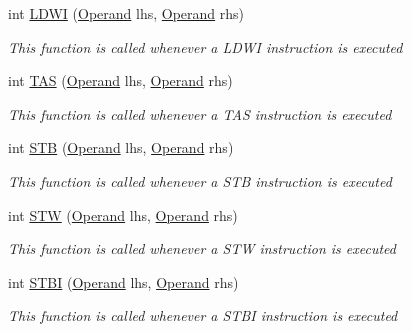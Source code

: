 \begin{DoxyCompactItemize}
int \hyperlink{class_c_p_u___o_s___simulator_1_1_c_p_u_1_1_instruction_a2a8c6cf1d6f14e9d219fabc5957cd586}{L\+D\+W\+I} (\hyperlink{class_c_p_u___o_s___simulator_1_1_c_p_u_1_1_operand}{Operand} lhs, \hyperlink{class_c_p_u___o_s___simulator_1_1_c_p_u_1_1_operand}{Operand} rhs)
\begin{DoxyCompactList}\small\item\em This function is called whenever a L\+D\+W\+I instruction is executed \end{DoxyCompactList}\item 
int \hyperlink{class_c_p_u___o_s___simulator_1_1_c_p_u_1_1_instruction_a78fbef41ec65046f35456e7cb161d037}{T\+A\+S} (\hyperlink{class_c_p_u___o_s___simulator_1_1_c_p_u_1_1_operand}{Operand} lhs, \hyperlink{class_c_p_u___o_s___simulator_1_1_c_p_u_1_1_operand}{Operand} rhs)
\begin{DoxyCompactList}\small\item\em This function is called whenever a T\+A\+S instruction is executed \end{DoxyCompactList}\item 
int \hyperlink{class_c_p_u___o_s___simulator_1_1_c_p_u_1_1_instruction_a26aa3d1a1f62f61acc3b37c7d57743f1}{S\+T\+B} (\hyperlink{class_c_p_u___o_s___simulator_1_1_c_p_u_1_1_operand}{Operand} lhs, \hyperlink{class_c_p_u___o_s___simulator_1_1_c_p_u_1_1_operand}{Operand} rhs)
\begin{DoxyCompactList}\small\item\em This function is called whenever a S\+T\+B instruction is executed \end{DoxyCompactList}\item 
int \hyperlink{class_c_p_u___o_s___simulator_1_1_c_p_u_1_1_instruction_aa1bc7540a41bcd8ab9273cfac88a5bf8}{S\+T\+W} (\hyperlink{class_c_p_u___o_s___simulator_1_1_c_p_u_1_1_operand}{Operand} lhs, \hyperlink{class_c_p_u___o_s___simulator_1_1_c_p_u_1_1_operand}{Operand} rhs)
\begin{DoxyCompactList}\small\item\em This function is called whenever a S\+T\+W instruction is executed \end{DoxyCompactList}\item 
int \hyperlink{class_c_p_u___o_s___simulator_1_1_c_p_u_1_1_instruction_a2724896fa80e3da440271b6dba5421a3}{S\+T\+B\+I} (\hyperlink{class_c_p_u___o_s___simulator_1_1_c_p_u_1_1_operand}{Operand} lhs, \hyperlink{class_c_p_u___o_s___simulator_1_1_c_p_u_1_1_operand}{Operand} rhs)
\begin{DoxyCompactList}\small\item\em This function is called whenever a S\+T\+B\+I instruction is executed \end{DoxyCompactList}\item 

\end{DoxyCompactItemize}
